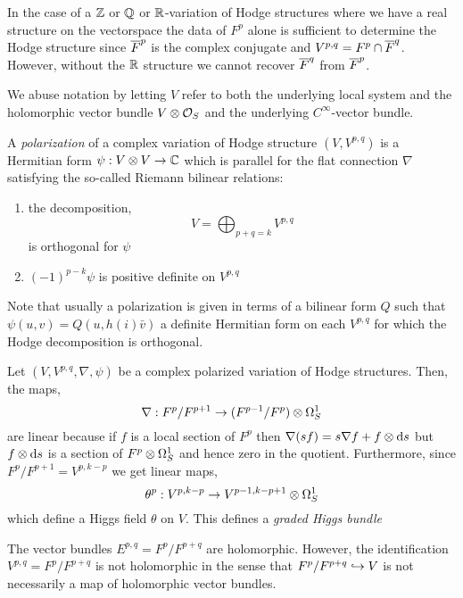 \documentclass[12pt]{article}
\begin{document}
\begin{rmk}
In the case of a $\mathbb{Z}$ or $\mathbb{Q}$ or $\mathbb{R}$-variation of Hodge structures where we have a real structure on the vectorspace the data of $F^p$ alone is sufficient to determine the Hodge structure since $\overline{F}^p$ is the complex conjugate and $V^{p,q} = F^p \cap \overline{F}^q$. However, without the $\mathbb{R}$ structure we cannot recover $\overline{F}^q$ from $\overline{F}^p$.
\end{rmk}

We abuse notation by letting $V$ refer to both the underlying local system and the holomorphic vector bundle $V \otimes \mathcal{O}_{S}$ and the underlying $C^{\infty}$-vector bundle.

\begin{defn}
A \textit{polarization} of a complex variation of Hodge structure $(V, V^{p,q})$ is a Hermitian form $\psi : V \otimes V \to \mathbb{C}$ which is parallel for the flat connection $\nabla$ satisfying the so-called Riemann bilinear relations:
\begin{enumerate}
\item the decomposition,
\[ V = \bigoplus_{p+q = k} V^{p,q} \]
is orthogonal for $\psi$
\item $(-1)^{p-k} \psi$ is positive definite on $V^{p,q}$
\end{enumerate}
\end{defn}

\begin{rmk}
Note that usually a polarization is given in terms of a bilinear form $Q$ such that $\psi(u,v) = Q(u,h(i) \bar{v})$ a definite Hermitian form on each $V^{p,q}$ for which the Hodge decomposition is orthogonal.
\end{rmk}

\begin{prop}
Let $(V, V^{p,q}, \nabla, \psi)$ be a complex polarized variation of Hodge structures. Then, the maps,
\[ \nabla : F^p / F^{p+1} \to (F^{p-1} / F^{p}) \otimes \Omega^1_S \] 
are linear because if $f$ is a local section of $F^p$ then $\nabla(sf) = s \nabla f + f \otimes \mathrm{d}{s}$ but $f \otimes \mathrm{d}{s}$ is a section of $F^p \otimes \Omega_S^1$ and hence zero in the quotient. Furthermore, since $F^p / F^{p+1} = V^{p,k-p}$ we get linear maps,
\[ \theta^p : V^{p,k-p} \to V^{p-1,k-p+1} \otimes \Omega^1_S \]
which define a Higgs field $\theta$ on $V$. This defines a \textit{graded Higgs bundle} 
\end{prop}

\begin{rmk}
The vector bundles $E^{p,q} = F^p / F^{p+q}$ are holomorphic. However, the identification $V^{p,q} = F^p / F^{p+q}$ is not holomorphic in the sense that $F^p / F^{p+q} \hookrightarrow V$ is not necessarily a map of holomorphic vector bundles.
\end{rmk}
\end{document}
